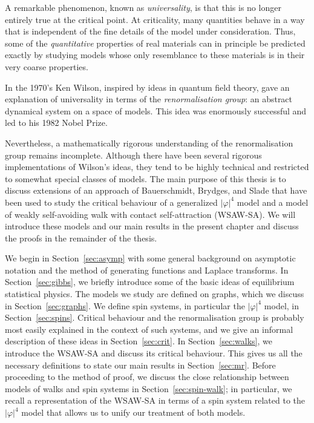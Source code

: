 A remarkable phenomenon, known as \emph{universality}, is that this is no longer
entirely true at the critical point. At criticality, many quantities behave in a
way that is independent of the fine details of the model under consideration. Thus,
some of the \emph{quantitative} properties of real materials can in principle be
predicted exactly by studying models whose only resemblance to these materials is
in their very coarse properties.

In the 1970's Ken Wilson, inspired by ideas in quantum field theory, gave an
explanation of universality in terms of the \emph{renormalisation group}:
an abstract dynamical system on a space of models. This idea was enormously successful
and led to his 1982 Nobel Prize.

Nevertheless, a mathematically rigorous understanding of the renormalisation group
remains incomplete. Although there have been several rigorous implementations of
Wilson's ideas, they tend to be highly technical and restricted to somewhat special
classes of models. The main purpose of this thesis is to discuss extensions of an
approach of Bauerschmidt, Brydges, and Slade that have been used to study the
critical behaviour of a generalized $|\varphi|^4$ model and a model of weakly
self-avoiding walk with contact self-attraction (WSAW-SA). We will introduce these
models and our main results in the present chapter and discuss the proofs in the
remainder of the thesis.

We begin in Section~\ref{sec:asymp} with some general background on asymptotic
notation and the method of generating functions and Laplace transforms. In
Section~\ref{sec:gibbs}, we briefly introduce some of the basic ideas of equilibrium
statistical physics. The models we study are defined on graphs, which we
discuss in Section~\ref{sec:graphs}. We define spin systems, in particular
the $|\varphi|^4$ model, in Section~\ref{sec:spins}. Critical behaviour and
the renormalisation group is probably most easily explained in the context of such
systems, and we give an informal description of these ideas in Section~\ref{sec:crit}.
In Section~\ref{sec:walks},
we introduce the WSAW-SA and discuss its critical behaviour. This gives us all
the necessary definitions to state our main results in Section~\ref{sec:mr}.
Before proceeding to the method of proof,
we discuss the close relationship between models of walks and spin systems in
Section~\ref{sec:spin-walk}; in particular, we recall a representation
of the WSAW-SA in terms of a spin system related to the $|\varphi|^4$ model
that allows us to unify our treatment of both models.

